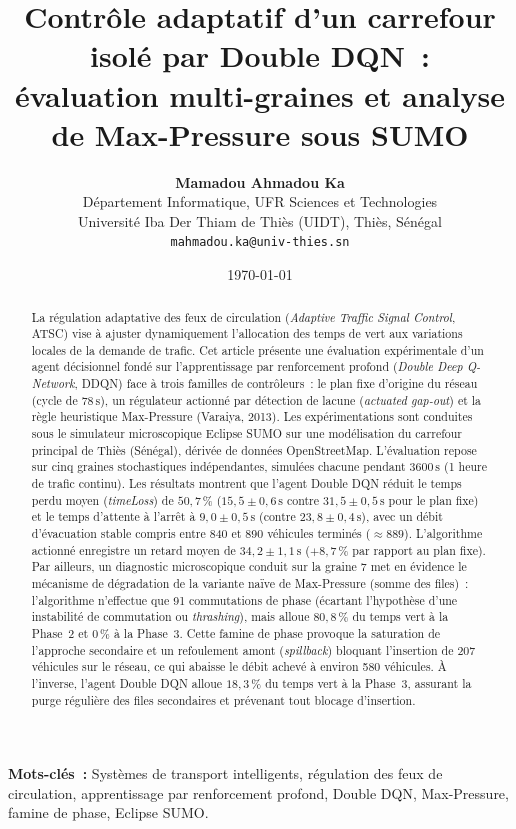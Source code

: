 \documentclass[11pt,a4paper]{article}
\title{\textbf{\Large Contrôle adaptatif d'un carrefour isolé par Double DQN~:\\[0.2cm]
évaluation multi-graines et analyse de Max-Pressure sous SUMO}}
\author{\textbf{Mamadou Ahmadou Ka}\\[0.15cm]
Département Informatique, UFR Sciences et Technologies\\
Université Iba Der Thiam de Thiès (UIDT), Thiès, Sénégal\\
\texttt{mahmadou.ka@univ-thies.sn}}
\date{\today}
\begin{document}
\maketitle

\begin{abstract}
La régulation adaptative des feux de circulation (\emph{Adaptive Traffic Signal Control}, ATSC) vise à ajuster dynamiquement l'allocation des temps de vert aux variations locales de la demande de trafic. Cet article présente une évaluation expérimentale d'un agent décisionnel fondé sur l'apprentissage par renforcement profond (\emph{Double Deep Q-Network}, DDQN) face à trois familles de contrôleurs~: le plan fixe d'origine du réseau (cycle de $78\,\mathrm{s}$), un régulateur actionné par détection de lacune (\emph{actuated gap-out}) et la règle heuristique Max-Pressure (Varaiya, 2013). Les expérimentations sont conduites sous le simulateur microscopique Eclipse SUMO sur une modélisation du carrefour principal de Thiès (Sénégal), dérivée de données OpenStreetMap. L'évaluation repose sur cinq graines stochastiques indépendantes, simulées chacune pendant $3600\,\mathrm{s}$ (1 heure de trafic continu). Les résultats montrent que l'agent Double DQN réduit le temps perdu moyen (\emph{timeLoss}) de $50{,}7\,\%$ ($15{,}5 \pm 0{,}6\,\mathrm{s}$ contre $31{,}5 \pm 0{,}5\,\mathrm{s}$ pour le plan fixe) et le temps d'attente à l'arrêt à $9{,}0 \pm 0{,}5\,\mathrm{s}$ (contre $23{,}8 \pm 0{,}4\,\mathrm{s}$), avec un débit d'évacuation stable compris entre 840 et 890 véhicules terminés ($\approx 889$). L'algorithme actionné enregistre un retard moyen de $34{,}2 \pm 1{,}1\,\mathrm{s}$ ($+8{,}7\,\%$ par rapport au plan fixe). Par ailleurs, un diagnostic microscopique conduit sur la graine 7 met en évidence le mécanisme de dégradation de la variante naïve de Max-Pressure (somme des files)~: l'algorithme n'effectue que 91 commutations de phase (écartant l'hypothèse d'une instabilité de commutation ou \emph{thrashing}), mais alloue $80{,}8\,\%$ du temps vert à la Phase~2 et $0\,\%$ à la Phase~3. Cette famine de phase provoque la saturation de l'approche secondaire et un refoulement amont (\emph{spillback}) bloquant l'insertion de 207 véhicules sur le réseau, ce qui abaisse le débit achevé à environ 580 véhicules. À l'inverse, l'agent Double DQN alloue $18{,}3\,\%$ du temps vert à la Phase~3, assurant la purge régulière des files secondaires et prévenant tout blocage d'insertion.
\end{abstract}

\vspace{0.2cm}
\noindent\textbf{Mots-clés~:} Systèmes de transport intelligents, régulation des feux de circulation, apprentissage par renforcement profond, Double DQN, Max-Pressure, famine de phase, Eclipse SUMO.
\end{document}
